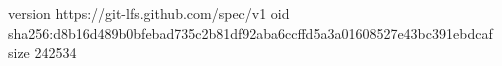version https://git-lfs.github.com/spec/v1
oid sha256:d8b16d489b0bfebad735c2b81df92aba6ccffd5a3a01608527e43bc391ebdcaf
size 242534
